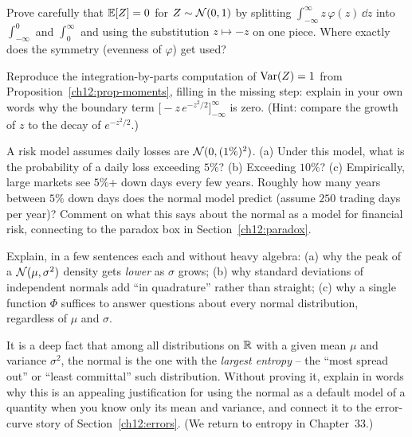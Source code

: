 \begin{exercise}
\label{ch12:exr-mean}
Prove carefully that $\operatorname{\mathbb{E}}[Z] = 0$ for $Z \sim \mathcal{N}(0,1)$ by splitting
$\int_{-\infty}^{\infty} z\,\varphi(z)\,\dd z$ into $\int_{-\infty}^{0}$ and
$\int_{0}^{\infty}$ and using the substitution $z \mapsto -z$ on one piece. Where
exactly does the symmetry (evenness of $\varphi$) get used?
\end{exercise}

\begin{exercise}
\label{ch12:exr-var}
Reproduce the integration-by-parts computation of $\operatorname{Var}(Z) = 1$ from
Proposition~\ref{ch12:prop-moments}, filling in the missing step: explain in your
own words why the boundary term $\big[-z\,e^{-z^2/2}\big]_{-\infty}^{\infty}$ is
zero. (Hint: compare the growth of $z$ to the decay of $e^{-z^2/2}$.)
\end{exercise}

\begin{exercise}
\label{ch12:exr-tails}
A risk model assumes daily losses are $\mathcal{N}(0, (1\%)^2)$. (a) Under this model,
what is the probability of a daily loss exceeding $5\%$? (b) Exceeding $10\%$?
(c) Empirically, large markets see $5\%$+ down days every few years. Roughly how
many years between $5\%$ down days does the normal model predict (assume $250$
trading days per year)? Comment on what this says about the normal as a model for
financial risk, connecting to the paradox box in Section~\ref{ch12:paradox}.
\end{exercise}

\begin{exercise}
\label{ch12:exr-concept}
Explain, in a few sentences each and without heavy algebra: (a) why the peak of a
$\mathcal{N}(\mu,\sigma^2)$ density gets \emph{lower} as $\sigma$ grows; (b) why
standard deviations of independent normals add ``in quadrature'' rather than
straight; (c) why a single function $\Phi$ suffices to answer questions about
every normal distribution, regardless of $\mu$ and $\sigma$.
\end{exercise}

\begin{exercise}
\label{ch12:exr-maxent}
It is a deep fact that among all distributions on $\mathbb{R}$ with a given mean $\mu$ and
variance $\sigma^2$, the normal is the one with the \emph{largest entropy} -- the
``most spread out'' or ``least committal'' such distribution. Without proving it,
explain in words why this is an appealing justification for using the normal as a
default model of a quantity when you know only its mean and variance, and connect
it to the error-curve story of Section~\ref{ch12:errors}. (We return to entropy in
Chapter~33.)
\end{exercise}
